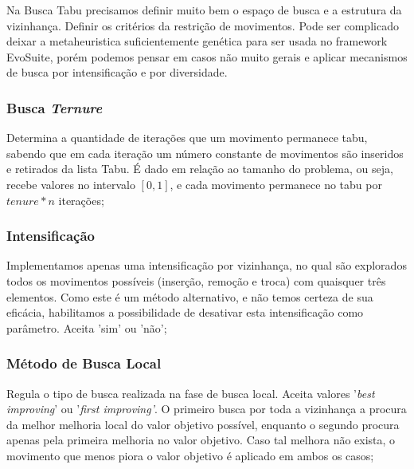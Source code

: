 \documentclass[12pt,a4paper]{article}
\begin{document}
Na Busca Tabu precisamos definir muito bem o espaço de busca e a estrutura da vizinhança. Definir os critérios da restrição de movimentos. Pode ser complicado deixar a metaheuristica
suficientemente genética para ser usada no framework EvoSuite, porém podemos pensar em casos não muito gerais e aplicar mecanismos de busca por intensificação e por diversidade.

    \subsubsection{Busca \textit{Ternure}}

        Determina a quantidade de iterações que um movimento permanece tabu, sabendo que em cada iteração um número constante de movimentos são inseridos e retirados da lista
        Tabu. É dado em relação ao tamanho do problema, ou seja, recebe valores no intervalo $[0,1]$, e cada movimento permanece no tabu por $\textit{tenure}*n$ iterações;


    \subsubsection{Intensificação}

        Implementamos apenas uma intensificação por vizinhança, no qual são explorados todos os movimentos possíveis (inserção, remoção e troca) com quaisquer três elementos. Como
        este é um método alternativo, e não temos certeza de sua eficácia, habilitamos a possibilidade de desativar esta intensificação como parâmetro. Aceita 'sim' ou 'não';

    \subsubsection{Método de Busca Local}

        Regula o tipo de busca realizada na fase de busca local. Aceita valores '\textit{best improving}' ou '\textit{first improving'}. O primeiro busca por toda a vizinhança
        a procura da melhor melhoria local do valor objetivo possível, enquanto o segundo procura apenas pela primeira melhoria no valor objetivo. Caso tal melhora não exista, o movimento que menos
        piora o valor objetivo é aplicado em ambos os casos;
\end{document}
